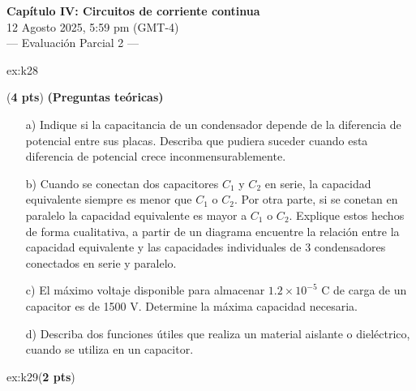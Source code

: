  \begin{multicols}{2}
   \begin{center}
         \LARGE{\textbf{Capítulo IV: Circuitos de corriente continua}}\\	
         \vspace{0.2cm}
         \large{12 Agosto 2025, 5:59 pm (GMT-4)}\\
         \large{— Evaluación Parcial 2 —}
     \end{center}
    \begin{excercise}[][][]{ex:k28}{(\textbf{4 pts})
        \textbf{(Preguntas teóricas)}
        \begin{itemize}
            \item[a)] Indique si la capacitancia de un condensador depende de la diferencia de potencial entre sus placas. Describa que pudiera suceder cuando esta diferencia de potencial crece inconmensurablemente.
            \item[b)] Cuando se conectan dos capacitores $C_1$ y $C_2$ en serie, la capacidad equivalente siempre es menor que $C_1$ o $C_2$. Por otra parte, si se conetan en paralelo la capacidad equivalente es mayor a $C_1$ o $C_2$. Explique estos hechos de forma cualitativa, a partir de un diagrama encuentre la relación entre la capacidad equivalente y las capacidades individuales de 3 condensadores conectados en serie y paralelo. 
            \item[c)] El máximo voltaje disponible para almacenar $1.2\times 10^{-5}$ C de carga de un capacitor  es de 1500 V. Determine la máxima capacidad necesaria.
            \item[d)] Describa dos funciones útiles que realiza un material aislante o dieléctrico, cuando se utiliza en un capacitor. 
        \end{itemize}
         }
    \end{excercise}
    \begin{excercise}[][][]{ex:k29}{(\textbf{2 pts})
}
\end{excercise}
\end{multicols}
